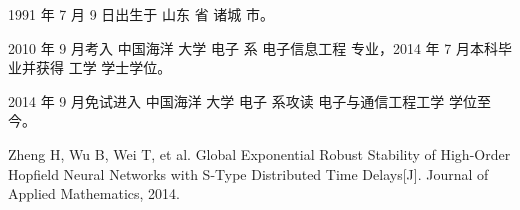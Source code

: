 \begin{resume}


  1991 年 7 月 9 日出生于 山东 省 诸城 市。

  2010 年 9 月考入 中国海洋 大学 电子 系 电子信息工程 专业，2014 年 7 月本科毕业并获得 工学 学士学位。

  2014 年 9 月免试进入 中国海洋 大学 电子 系攻读 电子与通信工程工学 学位至今。


  \begin{publications}
    \item Zheng H, Wu B, Wei T, et al. Global Exponential Robust Stability of High-Order Hopfield Neural Networks with S-Type Distributed Time Delays[J]. Journal of Applied Mathematics, 2014.
  \end{publications}

\end{resume}
